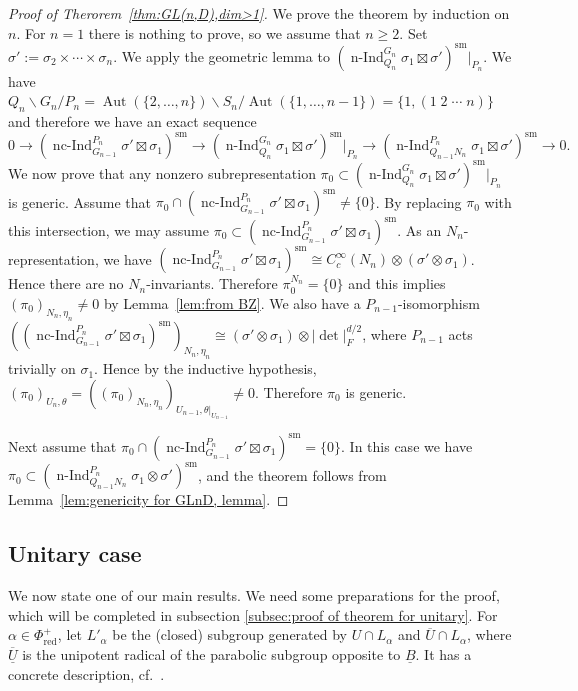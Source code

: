 \documentclass[a4paper]{amsart}
\numberwithin{equation}{section}
\theoremstyle{remark}
\theoremstyle{definition}
\DeclareMathOperator{\nInd}{n-Ind}
\DeclareMathOperator{\ncInd}{nc-Ind}
\DeclareMathOperator{\Aut}{Aut}
\newcommand{\sm}{\mathrm{sm}}
\newcommand{\alggrp}[1]{\underline{#1}}
\newcommand{\red}{\mathrm{red}}
\renewcommand{\simeq}{\cong}
\begin{document}
\begin{proof}[Proof of Therorem~\ref{thm:GL(n,D),dim>1}]
We prove the theorem by induction on $n$.
For $n = 1$ there is nothing to prove, so we assume that $n \ge 2$.
Set $\sigma' := \sigma_{2}\times\cdots\times\sigma_{n}$.
We apply the geometric lemma to $(\nInd_{Q_{n}}^{G_{n}}\sigma_{1}\boxtimes\sigma')^{\sm}|_{P_{n}}$.
We have $Q_{n}\backslash G_{n}/P_{n} = \Aut(\{2,\ldots,n\})\backslash S_{n}/\Aut(\{1,\ldots,n - 1\}) = \{1,(1\; 2\; \cdots\; n)\}$ and therefore we have an exact sequence
\[
0\to (\ncInd_{G_{n - 1}}^{P_{n}}\sigma'\boxtimes\sigma_{1})^{\sm}\to (\nInd_{Q_{n}}^{G_{n}}\sigma_1\boxtimes\sigma')^{\sm}|_{P_n}
\to (\nInd_{Q_{n - 1}N_{n}}^{P_{n}}\sigma_1\boxtimes\sigma')^{\sm}\to 0.
\]
We now prove that any nonzero subrepresentation $\pi_{0}\subset (\nInd_{Q_n}^{G_n}\sigma_1\boxtimes\sigma')^{\sm}|_{P_n}$ is generic.
Assume that $\pi_{0}\cap (\ncInd_{G_{n - 1}}^{P_{n}}\sigma'\boxtimes\sigma_{1})^{\sm}\ne\{0\}$.
By replacing $\pi_{0}$ with this intersection, we may assume $\pi_{0}\subset (\ncInd_{G_{n - 1}}^{P_{n}}\sigma'\boxtimes\sigma_{1})^{\sm}$.
As an $N_{n}$-representation, we have $(\ncInd_{G_{n - 1}}^{P_{n}}\sigma'\boxtimes\sigma_{1})^{\sm}\simeq C_{c}^{\infty}(N_{n})\otimes (\sigma'\otimes\sigma_{1})$.
Hence there are no $N_{n}$-invariants.
Therefore $\pi_{0}^{N_{n}} = \{0\}$ and this implies $(\pi_{0})_{N_{n},\eta_{n}}\ne 0$ by Lemma~\ref{lem:from BZ}.
We also have a $P_{n - 1}$-isomorphism $((\ncInd_{G_{n - 1}}^{P_{n}}\sigma'\boxtimes\sigma_{1})^{\sm})_{N_{n},\eta_{n}} \simeq (\sigma'\otimes\sigma_{1})\otimes\lvert\det\rvert^{d/2}_{F}$, where $P_{n-1}$ acts trivially on $\sigma_1$. Hence by the inductive hypothesis, $(\pi_{0})_{U_{n},\theta} = ((\pi_{0})_{N_{n},\eta_{n}})_{U_{n - 1},\theta|_{U_{n - 1}}}\ne 0$.
Therefore $\pi_{0}$ is generic.

Next assume that $\pi_{0}\cap (\ncInd_{G_{n - 1}}^{P_{n}}\sigma'\boxtimes\sigma_{1})^{\sm} = \{0\}$.
In this case we have $\pi_{0}\subset (\nInd_{Q_{n - 1}N_{n}}^{P_{n}}\sigma_{1}\otimes\sigma')^{\sm}$, and the theorem follows from Lemma~\ref{lem:genericity for GLnD, lemma}.
\end{proof}



\subsection{Unitary case}
\label{sec:unitary-case}
We now state one of our main results.
We need some preparations for the proof, which will be completed in subsection \ref{subsec:proof of theorem for unitary}.
For $\alpha\in\Phi_{\red}^{+}$, let $L'_{\alpha}$ be the (closed) subgroup generated by $U \cap L_{\alpha}$ and $\overline{U} \cap L_{\alpha}$, where $\overline{\alggrp{U}}$ is the unipotent radical of the parabolic subgroup opposite to $\alggrp{B}$.
It has a concrete description, cf.\ \cite[II.4]{AHHV}.
\end{document}
